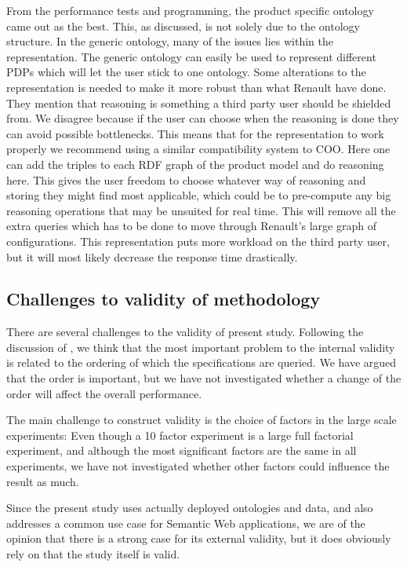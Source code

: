 \documentclass{llncs}
\begin{document}
From the performance tests and programming, the product specific
ontology came out as the best.  This, as discussed, is not solely due
to the ontology structure. In the generic ontology, many of the issues
lies within the representation.  The generic ontology can easily be
used to represent different PDPs which will let the user stick to one
ontology.  Some alterations to the representation is needed to make it
more robust than what Renault have done.  They mention that reasoning
is something a third party user should be shielded from. We disagree
because if the user can choose when the reasoning is done they can
avoid possible bottlenecks. This means that for the representation to
work properly we recommend using a similar compatibility system to
COO. Here one can add the triples to each RDF graph of the product
model and do reasoning here. This gives the user freedom to choose
whatever way of reasoning and storing they might find most applicable,
which could be to pre-compute any big reasoning operations that may be
unsuited for real time. This will remove all the extra queries which
has to be done to move through Renault's large graph of
configurations. This representation puts more workload on the third
party user, but it will most likely decrease the response time
drastically.

\subsection{Challenges to validity of methodology}

There are several challenges to the validity of present
study. Following the discussion of \cite{publication-9417}, we
think that the most important problem to the internal validity is
related to the ordering of which the specifications are queried. We
have argued that the order is important, but we have not investigated
whether a change of the order will affect the overall performance.

The main challenge to construct validity is the choice of factors in
the large scale experiments: Even though a 10 factor experiment is a
large full factorial experiment, and although the most significant
factors are the same in all experiments, we have not investigated
whether other factors could influence the result as much.

Since the present study uses actually deployed ontologies and data,
and also addresses a common use case for Semantic Web applications, we
are of the opinion that there is a strong case for its external
validity, but it does obviously rely on that the study itself is
valid.
\end{document}

